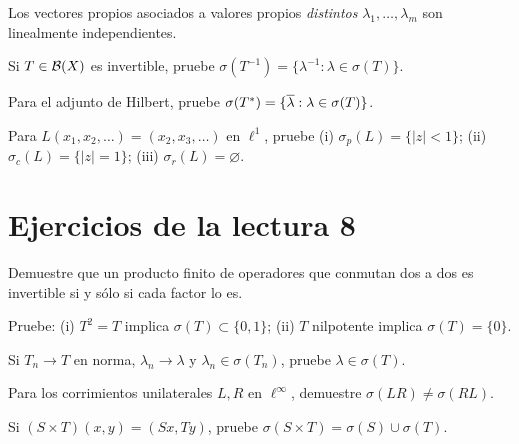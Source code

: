 \begin{ejercicio}\label{ej:v3-l07-4}
Los vectores propios asociados a valores propios \emph{distintos} $\lambda_1,\ldots,\lambda_m$ son linealmente independientes.
\end{ejercicio}


\begin{ejercicio}\label{ej:v3-l07-5}
Si $T\in\mathcal B(X)$ es invertible, pruebe $\sigma(T^{-1})=\{\lambda^{-1}:\lambda\in\sigma(T)\}$.
\end{ejercicio}


\begin{ejercicio}\label{ej:v3-l07-6}
Para el adjunto de Hilbert, pruebe $\sigma(T^*)=\{\overline{\lambda}:\lambda\in\sigma(T)\}$.
\end{ejercicio}


\begin{ejercicio}\label{ej:v3-l07-7}
Para $L(x_1,x_2,\ldots)=(x_2,x_3,\ldots)$ en $\ell^1$, pruebe (i) $\sigma_p(L)=\{|z|<1\}$; (ii) $\sigma_c(L)=\{|z|=1\}$; (iii) $\sigma_r(L)=\varnothing$.
\end{ejercicio}


\section{Ejercicios de la lectura 8}
\begin{ejercicio}\label{ej:v3-l08-1}
Demuestre que un producto finito de operadores que conmutan dos a dos es invertible si y sólo si cada factor lo es.
\end{ejercicio}


\begin{ejercicio}\label{ej:v3-l08-2}
Pruebe: (i) $T^2=T$ implica $\sigma(T)\subset\{0,1\}$; (ii) $T$ nilpotente implica $\sigma(T)=\{0\}$.
\end{ejercicio}


\begin{ejercicio}\label{ej:v3-l08-3}
Si $T_n\to T$ en norma, $\lambda_n\to\lambda$ y $\lambda_n\in\sigma(T_n)$, pruebe $\lambda\in\sigma(T)$.
\end{ejercicio}


\begin{ejercicio}\label{ej:v3-l08-4}
Para los corrimientos unilaterales $L,R$ en $\ell^\infty$, demuestre $\sigma(LR)\ne\sigma(RL)$.
\end{ejercicio}


\begin{ejercicio}\label{ej:v3-l08-5}
Si $(S\times T)(x,y)=(Sx,Ty)$, pruebe $\sigma(S\times T)=\sigma(S)\cup\sigma(T)$.
\end{ejercicio}


